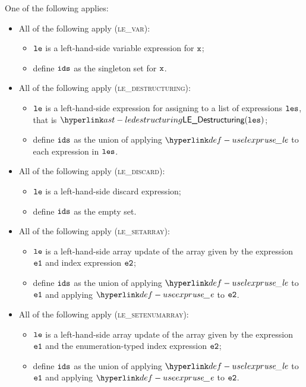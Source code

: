 \ProseParagraph
One of the following applies:
\begin{itemize}
  \item All of the following apply (\textsc{le\_var}):
  \begin{itemize}
    \item $\texttt{le}$ is a left-hand-side variable expression for $\texttt{x}$;
    \item define $\texttt{ids}$ as the singleton set for $\texttt{x}$.
  \end{itemize}

  \item All of the following apply (\textsc{le\_destructuring}):
  \begin{itemize}
    \item $\texttt{le}$ is a left-hand-side expression for assigning to a list of expressions $\texttt{les}$,
          that is $\LEDestructuring(\vles)$;
    \item define $\texttt{ids}$ as the union of applying $\uselexpr$ to each expression in $\texttt{les}$.
  \end{itemize}

  \item All of the following apply (\textsc{le\_discard}):
  \begin{itemize}
    \item $\texttt{le}$ is a left-hand-side discard expression;
    \item define $\texttt{ids}$ as the empty set.
  \end{itemize}

  \item All of the following apply (\textsc{le\_setarray}):
  \begin{itemize}
    \item $\texttt{le}$ is a left-hand-side array update of the array given by the expression $\texttt{e1}$ and index expression $\texttt{e2}$;
    \item define $\texttt{ids}$ as the union of applying $\uselexpr$ to $\texttt{e1}$ and applying $\useexpr$ to $\texttt{e2}$.
  \end{itemize}

  \item All of the following apply (\textsc{le\_setenumarray}):
  \begin{itemize}
    \item $\texttt{le}$ is a left-hand-side array update of the array given by the expression $\texttt{e1}$ and
          the enumeration-typed index expression $\texttt{e2}$;
    \item define $\texttt{ids}$ as the union of applying $\uselexpr$ to $\texttt{e1}$ and applying $\useexpr$ to $\texttt{e2}$.
  \end{itemize}


\end{itemize}
